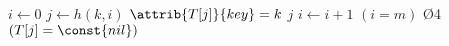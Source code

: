 \begin{codebox}
\li $i \gets 0$
\li \Repeat 
\li     $j \gets h(k,i)$
\li     \If $\attrib{T[j]}{key} = k$
\li     \Then
            \Return $j$
        \End
\li     $i \gets i + 1$
\li \Until $(i = m)$ \O4 $(T[j] = \const{nil})$
\li \Return {}
\end{codebox}